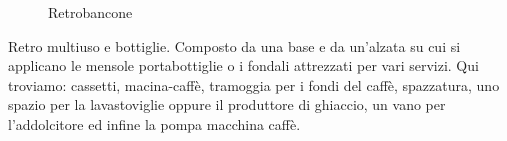 \begin{figure}[H]
	\captionsetup[subfloat]{farskip=2pt,captionskip=8pt}
	\centering
	\hspace{1cm}
	
	\caption{Retrobancone}
	\label{fig:imagesizes}
\end{figure}

\noindent
Retro multiuso e bottiglie. Composto da una base e da un'alzata su cui si applicano le mensole portabottiglie o i fondali attrezzati per vari servizi. Qui troviamo: cassetti, macina-caffè,  tramoggia per i fondi del caffè, spazzatura, uno spazio per la lavastoviglie oppure il produttore di ghiaccio, un vano per l’addolcitore ed infine la pompa macchina caffè.


